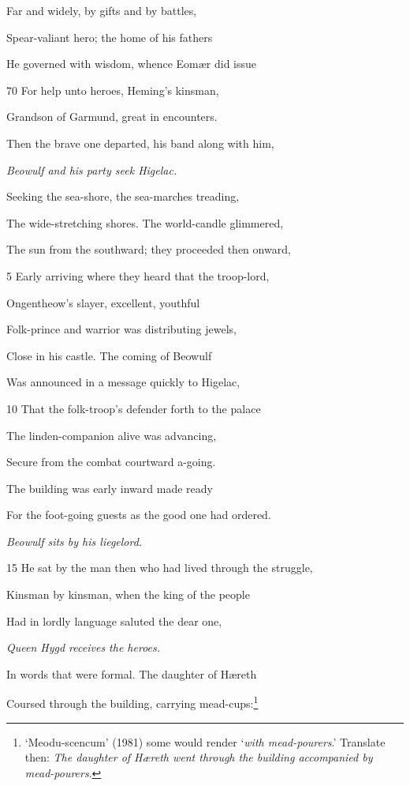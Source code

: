 Far and widely, by gifts and by battles,

Spear-valiant hero; the home of his fathers

He governed with wisdom, whence Eomær did issue

70
For help unto heroes, Heming’s kinsman,

Grandson of Garmund, great in encounters.



Then the brave one departed, his band along with him,

\emph{Beowulf and his
party seek Higelac.}

Seeking the sea-shore, the sea-marches treading,

The wide-stretching shores. The world-candle glimmered,

The sun from the southward; they proceeded then onward,

5
Early arriving where they heard that the troop-lord,

Ongentheow’s slayer, excellent, youthful

Folk-prince and warrior was distributing jewels,

Close in his castle. The coming of Beowulf

Was announced in a message quickly to Higelac,

10
That the folk-troop’s defender forth to the palace

The linden-companion alive was advancing,

Secure from the combat courtward a-going.

The building was early inward made ready

For the foot-going guests as the good one had ordered.

\emph{Beowulf sits by his
liegelord.}

15
He sat by the man then who had lived through the struggle,

Kinsman by kinsman, when the king of the people

Had in lordly language saluted the dear one,

\emph{Queen Hygd receives
the heroes.}

In words that were formal. The daughter of Hæreth

Coursed through the building, carrying mead-cups:\footnote{‘Meodu-scencum’ (1981) some would render ‘\emph{with mead-pourers}.’ Translate
then: \emph{The daughter of Hæreth went through the building accompanied by
mead-pourers}.}

